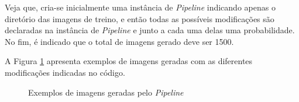 \par Veja que, cria-se inicialmente uma instância de \textit{Pipeline} indicando apenas o diretório das imagens de treino, e então todas as possíveis modificações são declaradas na instância de \textit{Pipeline} e junto a cada uma delas uma probabilidade. No fim, é indicado que o total de imagens gerado deve ser 1500.

\par A Figura \ref{figure:gestos_gerados_no_pipeline} apresenta exemplos de imagens geradas com as diferentes modificações indicadas no código.

\begin{figure}[H]%
    \centering
    \qquad
    \qquad
    \qquad
    \caption{Exemplos de imagens geradas pelo \textit{Pipeline}}%
    \label{figure:gestos_gerados_no_pipeline}
\end{figure}

